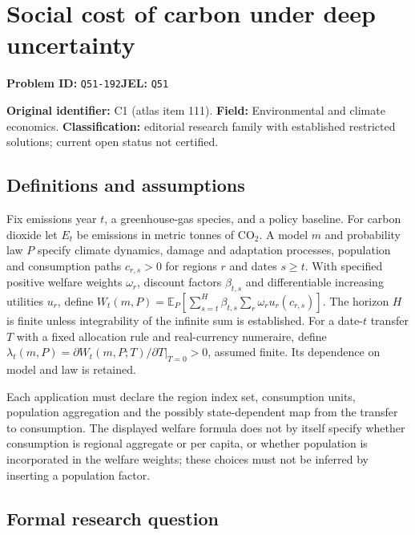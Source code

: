 \documentclass[11pt,a4paper]{article}
\begin{document}
\section*{Social cost of carbon under deep uncertainty}
\textbf{Problem ID:} \texttt{Q51-192}\quad \textbf{JEL:} \texttt{Q51}\par
\label{problem:OP-0111}
\label{atlas:prob:C1}

\noindent\textbf{Original identifier:} C1 (atlas item 111). \textbf{Field:} Environmental and climate economics. \textbf{Classification:} editorial research family with established restricted solutions; current open status not certified.

\subsection*{Definitions and assumptions}

Fix emissions year $t$, a greenhouse-gas species, and a policy baseline. For carbon dioxide let $E_t$ be emissions in metric tonnes of $\mathrm{CO}_2$. A model $m$ and probability law $P$ specify climate dynamics, damage and adaptation processes, population and consumption paths $c_{r,s}>0$ for regions $r$ and dates $s\ge t$. With specified positive welfare weights $\omega_r$, discount factors $\beta_{t,s}$ and differentiable increasing utilities $u_r$, define $W_t(m,P)=\mathbb E_P[\sum_{s=t}^{H}\beta_{t,s}\sum_r\omega_r u_r(c_{r,s})]$. The horizon $H$ is finite unless integrability of the infinite sum is established. For a date-$t$ transfer $T$ with a fixed allocation rule and real-currency numeraire, define $\lambda_t(m,P)=\left.\partial W_t(m,P;T)/\partial T\right|_{T=0}>0$, assumed finite. Its dependence on model and law is retained.

Each application must declare the region index set, consumption units, population aggregation and the possibly state-dependent map from the transfer to consumption. The displayed welfare formula does not by itself specify whether consumption is regional aggregate or per capita, or whether population is incorporated in the welfare weights; these choices must not be inferred by inserting a population factor.

\subsection*{Formal research question}
\end{document}
